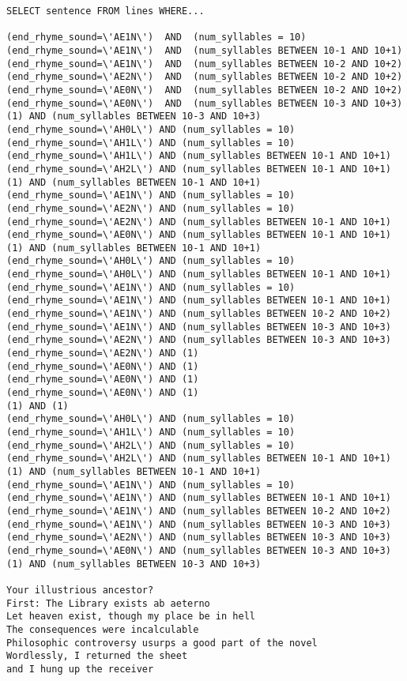 \documentclass[10pt]{article}
\begin{document}
\begin{verbatim}
SELECT sentence FROM lines WHERE...

(end_rhyme_sound=\'AE1N\')  AND  (num_syllables = 10)
(end_rhyme_sound=\'AE1N\')  AND  (num_syllables BETWEEN 10-1 AND 10+1)
(end_rhyme_sound=\'AE1N\')  AND  (num_syllables BETWEEN 10-2 AND 10+2)
(end_rhyme_sound=\'AE2N\')  AND  (num_syllables BETWEEN 10-2 AND 10+2)
(end_rhyme_sound=\'AE0N\')  AND  (num_syllables BETWEEN 10-2 AND 10+2)
(end_rhyme_sound=\'AE0N\')  AND  (num_syllables BETWEEN 10-3 AND 10+3)
(1) AND (num_syllables BETWEEN 10-3 AND 10+3)
(end_rhyme_sound=\'AH0L\') AND (num_syllables = 10)
(end_rhyme_sound=\'AH1L\') AND (num_syllables = 10)
(end_rhyme_sound=\'AH1L\') AND (num_syllables BETWEEN 10-1 AND 10+1)
(end_rhyme_sound=\'AH2L\') AND (num_syllables BETWEEN 10-1 AND 10+1)
(1) AND (num_syllables BETWEEN 10-1 AND 10+1)
(end_rhyme_sound=\'AE1N\') AND (num_syllables = 10)
(end_rhyme_sound=\'AE2N\') AND (num_syllables = 10)
(end_rhyme_sound=\'AE2N\') AND (num_syllables BETWEEN 10-1 AND 10+1)
(end_rhyme_sound=\'AE0N\') AND (num_syllables BETWEEN 10-1 AND 10+1)
(1) AND (num_syllables BETWEEN 10-1 AND 10+1)
(end_rhyme_sound=\'AH0L\') AND (num_syllables = 10)
(end_rhyme_sound=\'AH0L\') AND (num_syllables BETWEEN 10-1 AND 10+1)
(end_rhyme_sound=\'AE1N\') AND (num_syllables = 10)
(end_rhyme_sound=\'AE1N\') AND (num_syllables BETWEEN 10-1 AND 10+1)
(end_rhyme_sound=\'AE1N\') AND (num_syllables BETWEEN 10-2 AND 10+2)
(end_rhyme_sound=\'AE1N\') AND (num_syllables BETWEEN 10-3 AND 10+3)
(end_rhyme_sound=\'AE2N\') AND (num_syllables BETWEEN 10-3 AND 10+3)
(end_rhyme_sound=\'AE2N\') AND (1)
(end_rhyme_sound=\'AE0N\') AND (1)
(end_rhyme_sound=\'AE0N\') AND (1)
(end_rhyme_sound=\'AE0N\') AND (1)
(1) AND (1)
(end_rhyme_sound=\'AH0L\') AND (num_syllables = 10)
(end_rhyme_sound=\'AH1L\') AND (num_syllables = 10)
(end_rhyme_sound=\'AH2L\') AND (num_syllables = 10)
(end_rhyme_sound=\'AH2L\') AND (num_syllables BETWEEN 10-1 AND 10+1)
(1) AND (num_syllables BETWEEN 10-1 AND 10+1)
(end_rhyme_sound=\'AE1N\') AND (num_syllables = 10)
(end_rhyme_sound=\'AE1N\') AND (num_syllables BETWEEN 10-1 AND 10+1)
(end_rhyme_sound=\'AE1N\') AND (num_syllables BETWEEN 10-2 AND 10+2)
(end_rhyme_sound=\'AE1N\') AND (num_syllables BETWEEN 10-3 AND 10+3)
(end_rhyme_sound=\'AE2N\') AND (num_syllables BETWEEN 10-3 AND 10+3)
(end_rhyme_sound=\'AE0N\') AND (num_syllables BETWEEN 10-3 AND 10+3)
(1) AND (num_syllables BETWEEN 10-3 AND 10+3)

Your illustrious ancestor?
First: The Library exists ab aeterno
Let heaven exist, though my place be in hell
The consequences were incalculable
Philosophic controversy usurps a good part of the novel
Wordlessly, I returned the sheet
and I hung up the receiver
\end{verbatim}
\end{document}
